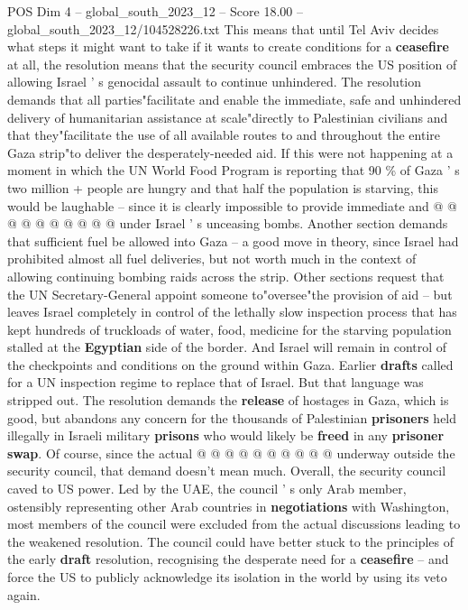 \begin{textsample}{POS Dim 4 – global\_south\_2023\_12 – Score 18.00 – global\_south\_2023\_12/104528226.txt}
This means that until Tel Aviv decides what steps it might want to take if it wants to create conditions for a \textbf{ceasefire} at all, the resolution means that the security council embraces the US position of allowing Israel ' s genocidal assault to continue unhindered.
The resolution demands that all parties"facilitate and enable the immediate, safe and unhindered delivery of humanitarian assistance at scale"directly to Palestinian civilians and that they"facilitate the use of all available routes to and throughout the entire Gaza strip"to deliver the desperately-needed aid.
If this were not happening at a moment in which the UN World Food Program is reporting that 90 \% of Gaza ' s two million + people are hungry and that half the population is starving, this would be laughable -- since it is clearly impossible to provide immediate and @ @ @ @ @ @ @ @ @ @ under Israel ' s unceasing bombs.
Another section demands that sufficient fuel be allowed into Gaza -- a good move in theory, since Israel had prohibited almost all fuel deliveries, but not worth much in the context of allowing continuing bombing raids across the strip.
Other sections request that the UN Secretary-General appoint someone to"oversee"the provision of aid -- but leaves Israel completely in control of the lethally slow inspection process that has kept hundreds of truckloads of water, food, medicine for the starving population stalled at the \textbf{Egyptian} side of the border.
And Israel will remain in control of the checkpoints and conditions on the ground within Gaza.
Earlier \textbf{drafts} called for a UN inspection regime to replace that of Israel.
But that language was stripped out.
The resolution demands the \textbf{release} of hostages in Gaza, which is good, but abandons any concern for the thousands of Palestinian \textbf{prisoners} held illegally in Israeli military \textbf{prisons} who would likely be \textbf{freed} in any \textbf{prisoner} \textbf{swap}.
Of course, since the actual @ @ @ @ @ @ @ @ @ @ underway outside the security council, that demand doesn't mean much.
Overall, the security council caved to US power.
Led by the UAE, the council ' s only Arab member, ostensibly representing other Arab countries in \textbf{negotiations} with Washington, most members of the council were excluded from the actual discussions leading to the weakened resolution.
The council could have better stuck to the principles of the early \textbf{draft} resolution, recognising the desperate need for a \textbf{ceasefire} -- and force the US to publicly acknowledge its isolation in the world by using its veto again.

\end{textsample}
